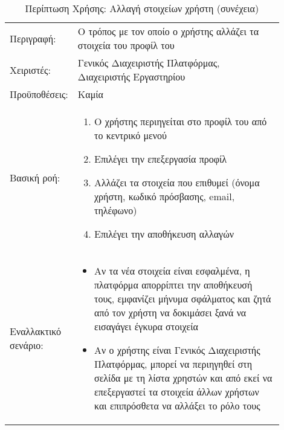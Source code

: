 %
%
\begin{longtable}{|p{0.14\linewidth}|p{0.76\linewidth}|}
	\caption{Περίπτωση Χρήσης: Αλλαγή στοιχείων χρήστη} \label{tab:use-case-change-profile} \\ \hline \endfirsthead
	\caption[{}]{Περίπτωση Χρήσης: Αλλαγή στοιχείων χρήστη (συνέχεια)} \\ \endhead \endfoot
	Περιγραφή: & Ο τρόπος με τον οποίο ο χρήστης αλλάζει τα στοιχεία του προφίλ του \\ \hline
	Χειριστές: & Γενικός Διαχειριστής Πλατφόρμας, Διαχειριστής Εργαστηρίου \\ \hline
	Προϋποθέσεις: & Καμία \\ \hline
	Βασική ροή: &
	\begin{enumerate}
		\vspace{-1cm}
		\addtolength{\itemindent}{-0.4cm}
		\item Ο χρήστης περιηγείται στο προφίλ του από το κεντρικό μενού
		\item Επιλέγει την επεξεργασία προφίλ
		\item Αλλάζει τα στοιχεία που επιθυμεί (όνομα χρήστη, κωδικό πρόσβασης, email, τηλέφωνο)
		\item Επιλέγει την αποθήκευση αλλαγών
		\vspace{-0.7cm}
	\end{enumerate} \\ \hline
	Εναλλακτικό σενάριο: &
	\begin{itemize}
		\vspace{-1cm}
		\addtolength{\itemindent}{-0.4cm}
		\item Αν τα νέα στοιχεία είναι εσφαλμένα, η πλατφόρμα απορρίπτει την αποθήκευσή τους, εμφανίζει μήνυμα σφάλματος και ζητά από τον χρήστη να δοκιμάσει ξανά να εισαγάγει έγκυρα στοιχεία
		\item Αν ο χρήστης είναι Γενικός Διαχειριστής Πλατφόρμας, μπορεί να περιηγηθεί στη σελίδα με τη λίστα χρηστών και από εκεί να επεξεργαστεί τα στοιχεία άλλων χρήστων και επιπρόσθετα να αλλάξει το ρόλο τους
		\vspace{-0.7cm}
	\end{itemize} \\ \hline
\end{longtable}

